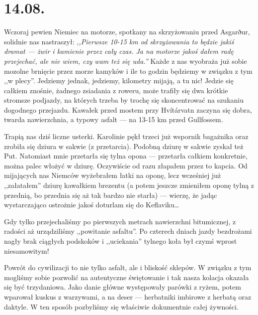 \chapter*{14.08.}

Wczoraj pewien Niemiec na motorze, spotkany na skrzyżowaniu przed Asgarður, solidnie nas nastraszył: \emph{,,Pierwsze 10-15 km od skrzyżowania to będzie jakiś dramat --- żwir i kamienie przez cały czas. Ja na motorze jakoś dałem radę przejechać, ale nie wiem, czy wam też się uda.''} Każde z nas wyobraża już sobie mozolne brnięcie przez morze kamyków i ile to godzin będziemy w związku z tym ,,w plecy''. Jedziemy jednak, jedziemy, kilometry mijają, a tu nic! Jedzie się całkiem znośnie, żadnego zsiadania z roweru, może trafiły się dwa krótkie stromsze podjazdy, na których trzeba by trochę się skoncentrować na szukaniu dogodnego przejazdu. Kawałek przed mostem przy Hvítárvatn zaczyna się dobra, twarda nawierzchnia, a typowy asfalt --- na 13-15 km przed Gullfossem.


Trapią nas dziś liczne usterki. Karolinie pękł trzeci już wspornik bagażnika oraz zrobiła się dziura w sakwie (z przetarcia). Podobną dziurę w sakwie zyskał też Put. Natomiast mnie przetarła się tylna opona --- przetarła całkiem konkretnie, można palec włożyć w dziurę. Oczywiście od razu złapałem przez to kapcia. Od mijających nas Niemców wyżebrałem łatki na oponę, lecz wcześniej już ,,załatałem'' dziurę kawałkiem brezentu (a potem jeszcze zmieniłem oponę tylną z przednią, bo przednia się aż tak bardzo nie starła) --- wierzę, że jadąc wystarczająco ostrożnie jakoś doturlam się do Keflaviku…


Gdy tylko przejechaliśmy po pierwszych metrach nawierzchni bitumicznej, z radości aż urządziliśmy ,,powitanie asfaltu''. Po czterech dniach jazdy bezdrożami nagły brak ciągłych podskoków i ,,uciekania'' tylnego koła był czymś wprost niesamowitym!

Powrót do cywilizacji to nie tylko asfalt, ale i bliskość sklepów. W związku z tym mogliśmy sobie pozwolić na autentyczne świętowanie i tak nasza kolacja okazała się być trzydaniowa. Jako danie główne występowały parówki z ryżem, potem wparował kuskus z warzywami, a na deser --- herbatniki imbirowe z herbatą oraz daktyle. W ten sposób pozbyliśmy się właściwie dokumentnie całej żywności.

